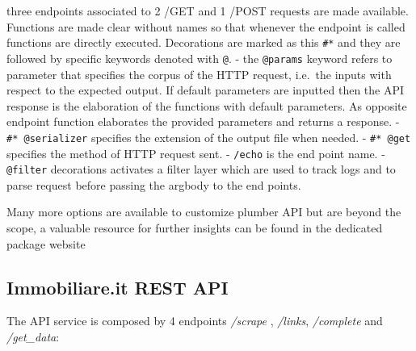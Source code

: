 \documentclass[
  12pt,
  a4paper,
  oneside]{book}
\theoremstyle{definition}
\theoremstyle{definition}
\theoremstyle{definition}
\theoremstyle{remark}
\begin{document}
three endpoints associated to 2 /GET and 1 /POST requests are made available. Functions are made clear without names so that whenever the endpoint is called functions are directly executed.
Decorations are marked as this \texttt{\#*} and they are followed by specific keywords denoted with \texttt{@}.
- the \texttt{@params} keyword refers to parameter that specifies the corpus of the HTTP request, i.e.~the inputs with respect to the expected output. If default parameters are inputted then the API response is the elaboration of the functions with default parameters. As opposite endpoint function elaborates the provided parameters and returns a response.
- \texttt{\#*\ @serializer} specifies the extension of the output file when needed.
- \texttt{\#*\ @get} specifies the method of HTTP request sent.
- \texttt{/echo} is the end point name.
- \texttt{@filter} decorations activates a filter layer which are used to track logs and to parse request before passing the argbody to the end points.

Many more options are available to customize plumber API but are beyond the scope, a valuable resource for further insights can be found in the dedicated package website \citep{an_api_generator_for_r}

\hypertarget{immobiliare.it-rest-api}{%
\subsection{Immobiliare.it REST API}\label{immobiliare.it-rest-api}}

The API service is composed by 4 endpoints \emph{/scrape} , \emph{/links}, \emph{/complete} and \emph{/get\_data}:
\end{document}
